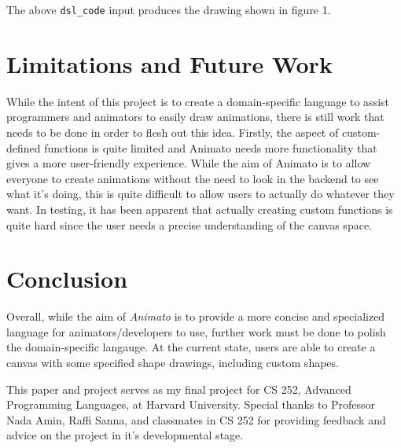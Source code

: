 \documentclass[acmsmall,screen]{acmart}
\begin{document}
The above \texttt{dsl\_code} input produces the drawing shown in figure 1.

\section{Limitations and Future Work}
While the intent of this project is to create a domain-specific language to assist programmers and animators to easily draw animations, there is still work that needs to be done in order to flesh out this idea.
Firstly, the aspect of custom-defined functions is quite limited and Animato needs more functionality that gives a more user-friendly experience.
While the aim of Animato is to allow everyone to create animations without the need to look in the backend to see what it's doing, this is quite difficult to allow users to actually do whatever they want.
In testing, it has been apparent that actually creating custom functions is quite hard since the user needs a precise understanding of the canvas space.

\section{Conclusion}
Overall, while the aim of \textit{Animato} is to provide a more concise and specialized language for animators/developers to use, further work must be done to polish the domain-specific langauge.
At the current state, users are able to create a canvas with some specified shape drawings, including custom shapes. 

\begin{acks}
This paper and project serves as my final project for CS 252, Advanced Programming Languages, at Harvard University. Special thanks to Professor Nada Amin, Raffi Sanna, and classmates in CS 252 for providing feedback and advice on the project in it's developmental stage.
\end{acks}



\end{document}
